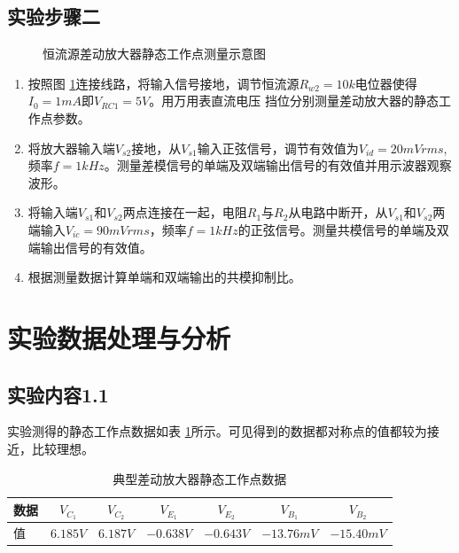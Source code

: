 \documentclass[a4paper,11pt,UTF8]{ctexart}
\begin{document}
\subsection{实验步骤二}
\begin{figure}[htbp]
  \centering
  \caption{恒流源差动放大器静态工作点测量示意图}
  \label{fig:sStatic}
  \end{figure}
\begin{enumerate}
  \item 按照图 \ref{fig:sStatic}连接线路，将输入信号接地，调节恒流源$R_{w2}=10k$电位器使得$I_0=1mA$即$V_{RC1}=5V$。用万用表直流电压
  挡位分别测量差动放大器的静态工作点参数。
  \item 将放大器输入端$V_{s2}$接地，从$V_{s1}$输入正弦信号，调节有效值为$V_{id}=20mVrms$,频率$f=1kHz$。测量差模信号的单端及双端输出信号的有效值并用示波器观察波形。
  \item 将输入端$V_{s1}$和$V_{s2}$两点连接在一起，电阻$R_1$与$R_2$从电路中断开，从$V_{s1}$和$V_{s2}$两端输入$V_{ic}=90mVrms$，频率$f=1kHz$的正弦信号。测量共模信号的单端及双端输出信号的有效值。
  \item 根据测量数据计算单端和双端输出的共模抑制比。
\end{enumerate}

\section{实验数据处理与分析}
\subsection{实验内容1.1}
  实验测得的静态工作点数据如表 \ref{tab:nSTab}所示。可见得到的数据都对称点的值都较为接近，比较理想。
  \begin{table}[!h!tbp]
    \caption{典型差动放大器静态工作点数据}\label{tab:nSTab}
      \centering
      \begin{tabular}{|l|c|c|c|c|c|c|}
      \hline
      数据 &$V_{C_1}$&$V_{C_2}$&$V_{E_1}$&$V_{E_2}$&$V_{B_1}$&$V_{B_2}$         \\ \hline
      值   &$6.185V$&$6.187V$&$-0.638V$&$-0.643V$&$-13.76mV$&$-15.40mV$     \\ \hline
    \end{tabular}
    \end{table}
\end{document}
